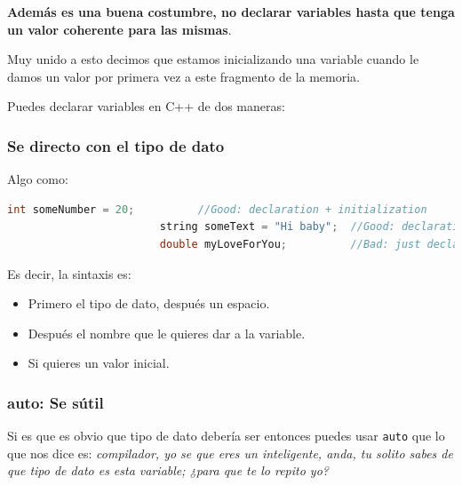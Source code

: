 \documentclass[12pt, fleqn]{report}                             %
\theoremstyle{break}                                            %
\newcommand{\textCode}[1]  { \texttt{#1} }                      %
\begin{document}
                \textbf{Además es una buena costumbre, no declarar variables hasta que tenga un valor coherente para
                las mismas}.

                \clearpage

                Muy unido a esto decimos que estamos inicializando una variable cuando le damos
                un valor por primera vez a este fragmento de la memoria.
                
                Puedes declarar variables en C++ de dos maneras:

                \subsubsection{Se directo con el tipo de dato}

                    Algo como:
                    \begin{lstlisting}[language=C++, gobble=24]
                        int someNumber = 20;          //Good: declaration + initialization
                        string someText = "Hi baby";  //Good: declaration + initialization
                        double myLoveForYou;          //Bad: just declaration
                    \end{lstlisting}

                    Es decir, la sintaxis es:
                    \begin{itemize}
                        \item Primero el tipo de dato, después un espacio.
                        \item Después el nombre que le quieres dar a la variable.
                        \item Si quieres un valor inicial.
                    \end{itemize} 

                \subsubsection{auto: Se sútil}

                    Si es que es obvio que tipo de dato debería ser entonces puedes usar \textCode{auto}
                    que lo que nos dice es: \textit{compilador, yo se que eres un inteligente, anda, 
                    tu solito sabes de que tipo de dato es esta variable; ¿para que te lo repito yo?}
                    
\end{document}
